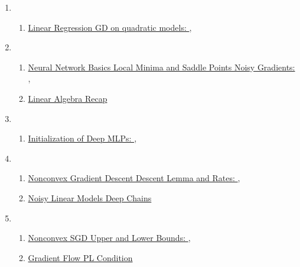 \documentclass[11pt]{article}
\begin{document}
\begin{enumerate}
	\item  %
	\begin{enumerate}
		\item  \href{https://mp.weixin.qq.com/s/Nm15Bvq1UFck9pu6PBze9Q}{Linear Regression GD on quadratic models: },\quad  \href{https://mp.weixin.qq.com/s/ng2rwFauVWaiUZcm_quyZQ}{} %
	\end{enumerate}
	\item  %
	\begin{enumerate}
		\item  \href{https://mp.weixin.qq.com/s/e2lu0_CoJSobPFBC1Eqw-w}{Neural Network Basics Local Minima and Saddle Points Noisy Gradients: },\quad  \href{https://mp.weixin.qq.com/s/beHsqBW6m8wqj-Q-tqsBHw}{}	%
		\item \href{https://mp.weixin.qq.com/s/4qu2jWGpM9OstznYOvtHTw}{Linear Algebra Recap}	%
	\end{enumerate}
	\item  %
	\begin{enumerate}
		\item \href{https://mp.weixin.qq.com/s/zKrfhVvSeiDHNNF8FOHuVw}{Initialization of Deep MLPs: },\quad \href{https://mp.weixin.qq.com/s/2ITNH-wwlAx-zAr9-WrU_A}{}	%
	\end{enumerate}
	\item  %
	\begin{enumerate}
		\item  \href{https://mp.weixin.qq.com/s/KBLW1P0WhqSnTMSY6as_zw}{Nonconvex Gradient Descent Descent Lemma and Rates: },\quad \href{https://mp.weixin.qq.com/s/lWmRvUNaSC0SSadPl9KpeA}{}  %
		\item \href{https://mp.weixin.qq.com/s/VsFcJATlqDcg52XI9fkeNg}{Noisy Linear Models Deep Chains} %
	\end{enumerate}
	\item  %
	\begin{enumerate}
		\item  \href{https://mp.weixin.qq.com/s/lrsJ7UtepSBTTjsjtVGbkg}{Nonconvex SGD Upper and Lower Bounds: },\quad \href{https://mp.weixin.qq.com/s/3Xt0ZckiRZcayyBtoZQzBA}{} %
		\item \href{https://mp.weixin.qq.com/s/dzXiLWImnEndnOZpuA3xsQ}{Gradient Flow PL Condition} %
	\end{enumerate}

\end{enumerate}
\end{document}
